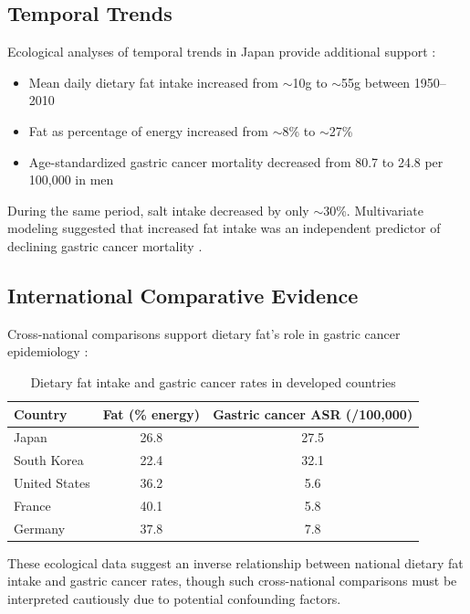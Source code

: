 \documentclass[review]{elsarticle}
\begin{document}
\subsection{Temporal Trends}

Ecological analyses of temporal trends in Japan provide additional support \cite{inoue2005,katanoda2013}:

\begin{itemize}
    \item Mean daily dietary fat intake increased from $\sim$10g to $\sim$55g between 1950--2010
    \item Fat as percentage of energy increased from $\sim$8\% to $\sim$27\%
    \item Age-standardized gastric cancer mortality decreased from 80.7 to 24.8 per 100,000 in men
\end{itemize}

During the same period, salt intake decreased by only $\sim$30\%. Multivariate modeling suggested that increased fat intake was an independent predictor of declining gastric cancer mortality \cite{katanoda2013}.

\subsection{International Comparative Evidence}

Cross-national comparisons support dietary fat's role in gastric cancer epidemiology \cite{bertuccio2009}:

\begin{table}[h]
\centering
\caption{Dietary fat intake and gastric cancer rates in developed countries}
\begin{tabular}{lcc}
\toprule
Country & Fat (\% energy) & Gastric cancer ASR (/100,000) \\
\midrule
Japan & 26.8 & 27.5 \\
South Korea & 22.4 & 32.1 \\
United States & 36.2 & 5.6 \\
France & 40.1 & 5.8 \\
Germany & 37.8 & 7.8 \\
\bottomrule
\end{tabular}
\end{table}

These ecological data suggest an inverse relationship between national dietary fat intake and gastric cancer rates, though such cross-national comparisons must be interpreted cautiously due to potential confounding factors.
\end{document}
